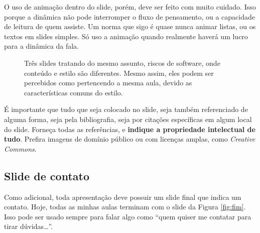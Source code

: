 O uso de animação dentro do slide, porém, deve ser feito com muito cuidado.
 Isso porque a dinâmica não pode interromper o fluxo de pensamento, ou a capacidade de leitura de quem assiste.
 Um norma que sigo é quase nunca animar listas, ou os textos em slides simples.
 Só uso a animação quando realmente haverá um lucro para a dinâmica da fala.

\begin{figure}[hbt]
    \centering
\caption{Três slides tratando do mesmo assunto, riscos de software, onde conteúdo e estilo são diferentes. Mesmo assim, eles podem ser percebidos como pertencendo a mesma aula, devido as características comuns do estilo.}
\label{fig:tres}
\end{figure}


É importante que tudo que seja colocado no slide, seja também referenciado de alguma forma, seja pela bibliografia, seja por citações específicas em algum local do slide.
Forneça todas as referências, e \textbf{indique a propriedade intelectual de tudo}. Prefira imagens de domínio público ou com licenças amplas, como \textit{Creative Commons}.


\subsection{Slide de contato}

Como adicional, toda apresentação deve possuir um slide final que indica um contato.
Hoje, todas as minhas aulas terminam com o slide da Figura \ref{fig:fim}.
Isso pode ser usado sempre para falar algo como ``quem quiser me contatar para tirar dúvidas\dots''.

